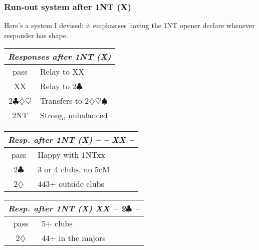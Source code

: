 \documentclass[a4paper, twoside, 11pt]{article}
\begin{document}
\begin{multicols}{3}

\subsubsection*{Run-out system after 1NT (X)}
Here's a system I devised: it emphasises having the 1NT opener declare whenever responder has shape.

\begin{center}
\begin{tabular}{ |c|l| }
 \hline
 \multicolumn{2}{|c|}{\textit{Responses after 1NT (X)}} \\
 \hline
 pass & Relay to XX \\
 XX & Relay to 2$\clubsuit$ \\
 2$\clubsuit\diamondsuit\heartsuit$ & Transfers to 2$\diamondsuit\heartsuit\spadesuit$ \\
 2NT & Strong, unbalanced\\
 \hline
\end{tabular}
\end{center}



\begin{center}
\begin{tabular}{ |c|l| }
 \hline
 \multicolumn{2}{|c|}{\textit{Resp. after 1NT (X) -- -- XX --}} \\
 \hline
 pass & Happy with 1NTxx \\
 2$\clubsuit$ & 3 or 4 clubs, no 5cM \\
 2$\diamondsuit$ & 443+ outside clubs \\
 \hline
\end{tabular}
\end{center}

\begin{center}
\begin{tabular}{ |c|l| }
 \hline
 \multicolumn{2}{|c|}{\textit{Resp. after 1NT (X) XX -- 2$\clubsuit$ --}} \\
 \hline
 pass & 5+ clubs \\
 2$\diamondsuit$ & 44+ in the majors \\


\end{tabular}
\end{center}
\end{multicols}
\end{document}
